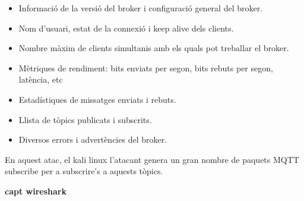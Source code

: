 \begin{itemize}
    \item Informació de la versió del broker i configuració general del broker.
    \item Nom d'usuari, estat de la connexió i keep alive dels clients.
    \item Nombre màxim de clients simultanis amb els quals pot treballar el broker.
    \item Mètriques de rendiment: bits enviats per segon, bits rebuts per segon, latència, etc
    \item Estadístiques de missatges enviats i rebuts.
    \item Llista de tòpics publicats i subscrits.
    \item Diversos errors i advertències del broker.
\end{itemize}

En aquest atac, el kali linux l'atacant genera un gran nombre de paquets MQTT subscribe per a subscrire's a aquests tòpics. 

\textbf{capt wireshark}



